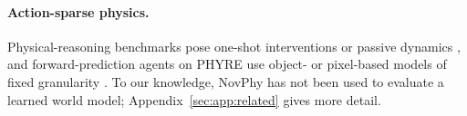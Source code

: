\paragraph{Action-sparse physics.}
Physical-reasoning benchmarks pose one-shot interventions or passive dynamics \citep{bakhtin2019phyre,bear2021physion,yi2020clevrer}, and forward-prediction agents on PHYRE use object- or pixel-based models of fixed granularity \citep{girdhar2020forward}. To our knowledge, NovPhy \citep{pinto2024novphy} has not been used to evaluate a learned world model; Appendix~\ref{sec:app:related} gives more detail.
